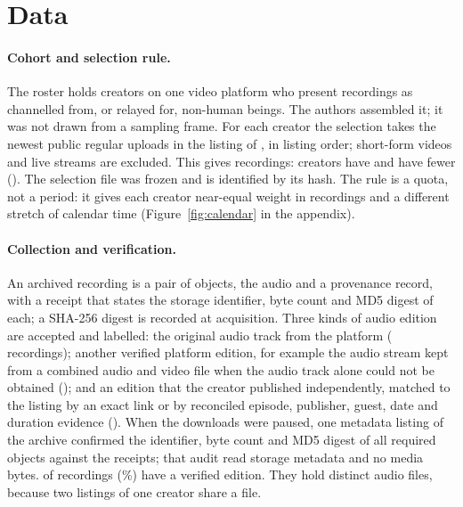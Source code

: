 \documentclass[letterpaper]{article} %
\begin{document}
\section{Data}
\label{sec:data}



\paragraph{Cohort and selection rule.} The roster holds \NCreators{} creators on one video platform who present recordings as channelled from, or relayed for, non-human beings. The authors assembled it; it was not drawn from a sampling frame. For each creator the selection takes the newest \NPerCreator{} public regular uploads in the listing of \ListingDate, in listing order; short-form videos and live streams are excluded. This gives \NSelected{} recordings: \NCreatorsFullTwenty{} creators have \NPerCreator{} and \NCreatorsFewerThanTwenty{} have fewer (\FewerThanTwentyCounts). The selection file was frozen and is identified by its hash. The rule is a quota, not a period: it gives each creator near-equal weight in recordings and a different stretch of calendar time (Figure~\ref{fig:calendar} in the appendix).

\paragraph{Collection and verification.} An archived recording is a pair of objects, the audio and a provenance record, with a receipt that states the storage identifier, byte count and MD5 digest of each; a SHA-256 digest is recorded at acquisition. Three kinds of audio edition are accepted and labelled: the original audio track from the platform (\NArchivedNative{} recordings); another verified platform edition, for example the audio stream kept from a combined audio and video file when the audio track alone could not be obtained (\NArchivedOtherPlatform); and an edition that the creator published independently, matched to the listing by an exact link or by reconciled episode, publisher, guest, date and duration evidence (\NArchivedPublisher). When the downloads were paused, one metadata listing of the archive confirmed the identifier, byte count and MD5 digest of all \NVerifiedObjects{} required objects against the receipts; that audit read storage metadata and no media bytes. \NArchived{} of \NSelected{} recordings (\PctArchived\%) have a verified edition. They hold \NArchivedDistinctAudio{} distinct audio files, because two listings of one creator share a file.
\end{document}
